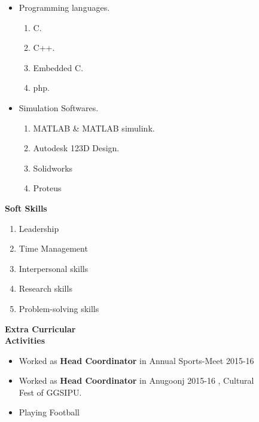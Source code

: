 \documentclass[11pt]{article}
\begin{document}
\begin{itemize}
\vspace{-0.60in}	                                     		\addtolength{\itemindent}{1in}	                                     \item Programming languages.
{\begin{enumerate}
\addtolength{\itemindent}{1.359in}                             		\item C.
\item C++.
\item Embedded C.
\item php.
\end{enumerate}
}
\item  Simulation Softwares.
{\begin{enumerate}
\addtolength{\itemindent}{1.359in}                             		\item MATLAB \& MATLAB simulink.
\item Autodesk 123D Design.
\item Solidworks 
\item Proteus
\end{enumerate}
}
\end{itemize}

\begin{flushleft}
\Large \textbf{Soft Skills}\small
\begin{flushright} 
\begin{enumerate}
\addtolength{\itemindent}{1.7in} 
\vspace{-0.30in} 
\item Leadership
\item Time Management	
\item Interpersonal skills
\item Research skills 
\item Problem-solving skills
\end{enumerate} 
\end{flushright}
\end{flushleft}	

\begin{flushleft}
{\Large \bf{Extra Curricular\\ Activities}}
\begin{itemize}
\addtolength{\itemindent}{1.7in}
\vspace{-0.50in} 
\item Worked as {\bf Head Coordinator} in Annual Sports-Meet 2015-16 
\item Worked as {\bf Head Coordinator} in Anugoonj 2015-16 , Cultural\\ \hspace{1.65in} Fest of GGSIPU.
\item Playing Football
\end{itemize}
\end{flushleft}                                    		
\end{document}
